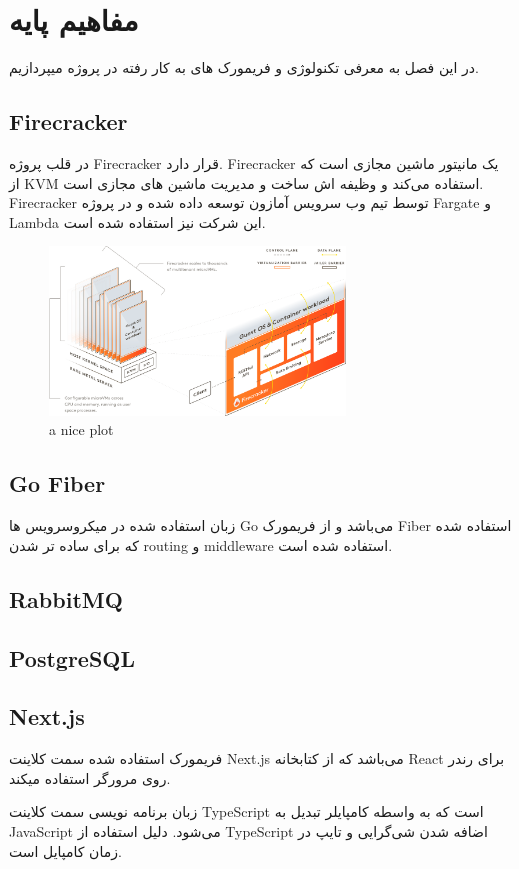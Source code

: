\chapter{مفاهیم پایه}

در این فصل به معرفی تکنولوژی و فریمورک های به کار رفته در پروژه میپردازیم.

\section{Firecracker}
در قلب پروژه Firecracker قرار دارد. Firecracker یک مانیتور ماشین مجازی است که از KVM استفاده می‌کند و
وظیفه اش ساخت و مدیریت ماشین های مجازی است.
Firecracker توسط تیم وب سرویس آمازون توسعه داده شده و در پروژه Fargate و Lambda این شرکت نیز استفاده شده است.

\begin{figure}[h]
    \centering
    \includegraphics[width=0.7\textwidth]{./1-Introduction/firecracker-diagram.png}
    \caption{a nice plot}
    \label{fig:mesh1}
\end{figure}

\section{Go Fiber}
زبان استفاده شده در میکروسرویس ها Go می‌باشد و از فریمورک Fiber استفاده شده که برای ساده تر شدن routing و middleware استفاده شده است.

\section{RabbitMQ}

\section{PostgreSQL}

\section{Next.js}
فریمورک استفاده شده سمت کلاینت Next.js می‌باشد که از کتابخانه React برای رندر روی مرورگر استفاده میکند.


زبان برنامه نویسی سمت کلاینت TypeScript است که به واسطه کامپایلر تبدیل به JavaScript می‌شود.
دلیل استفاده از TypeScript اضافه شدن شی‌گرایی و تایپ در زمان کامپایل است.
